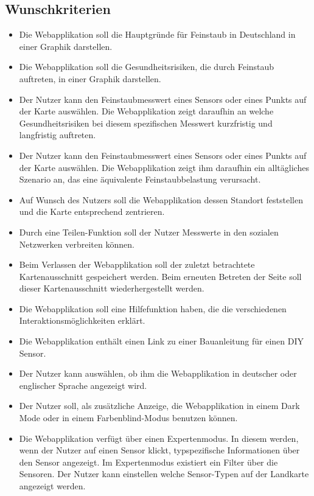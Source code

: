 \subsection{Wunschkriterien}
   \begin{itemize}
   	\item Die Webapplikation soll die Hauptgründe für \gls{Feinstaub} in Deutschland in einer Graphik darstellen.
   	
   	\item Die Webapplikation soll die Gesundheitsrisiken, die durch \gls{Feinstaub} auftreten, in einer Graphik darstellen. 

	\item Der Nutzer kann den Feinstaubmesswert eines Sensors oder eines Punkts auf der Karte auswählen. 
	Die Webapplikation zeigt daraufhin an welche Gesundheitsrisiken bei diesem spezifischen Messwert kurzfristig und langfristig auftreten.
	
	\item Der Nutzer kann den Feinstaubmesswert eines Sensors oder eines Punkts auf der Karte auswählen. 
	Die Webapplikation zeigt ihm daraufhin ein alltägliches Szenario an, das eine äquivalente Feinstaubbelastung verursacht.
	
	\item Auf Wunsch des Nutzers soll die Webapplikation dessen Standort feststellen und die Karte entsprechend zentrieren.
	
	\item Durch eine Teilen-Funktion soll der Nutzer Messwerte in den sozialen Netzwerken verbreiten können.
	
	\item Beim Verlassen der Webapplikation soll der zuletzt betrachtete Kartenausschnitt gespeichert werden. Beim erneuten Betreten der Seite soll dieser Kartenausschnitt wiederhergestellt werden.
	
	\item Die Webapplikation soll eine Hilfefunktion haben, die die verschiedenen Interaktionsmöglichkeiten erklärt.
	
	\item Die Webapplikation enthält einen Link zu einer Bauanleitung für einen \gls{DIY} \gls{Sensor}.
	
	\item Der Nutzer kann auswählen, ob ihm die Webapplikation in deutscher oder englischer Sprache angezeigt wird.
	
	\item Der Nutzer soll, als zusätzliche Anzeige, die Webapplikation in einem Dark Mode oder in einem Farbenblind-Modus benutzen können.
	
	\item Die Webapplikation verfügt über einen Expertenmodus. In diesem werden, wenn der Nutzer auf einen Sensor klickt, typspezifische Informationen über den \gls{Sensor} angezeigt.
	Im Expertenmodus existiert ein Filter über die Sensoren. Der Nutzer kann einstellen welche \gls{Sensor}-Typen auf der Landkarte angezeigt werden.        
\end{itemize}


